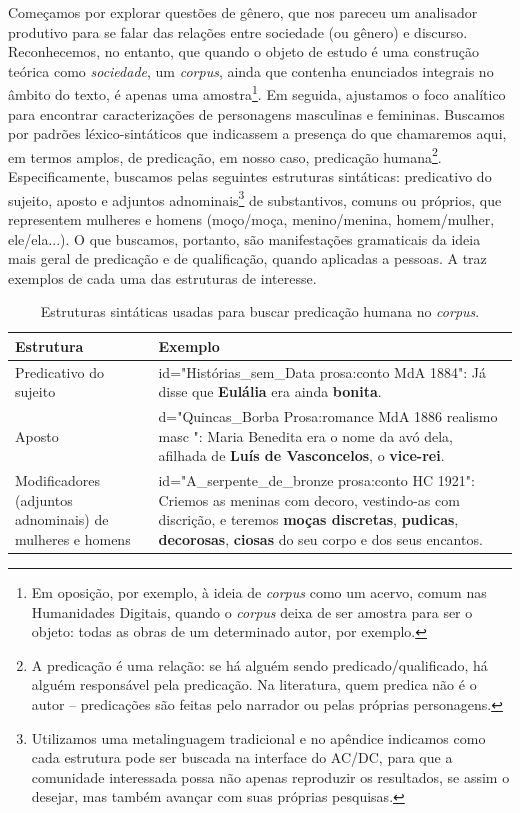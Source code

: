 \documentclass[portuguese]{textolivre}
\begin{document}
Começamos por explorar questões de gênero, que nos pareceu um analisador produtivo para se falar das relações entre sociedade (ou gênero) e discurso. Reconhecemos, no entanto, que quando o objeto de estudo é uma construção teórica como \textit{sociedade}, um \textit{corpus}, ainda que contenha enunciados integrais no âmbito do texto, é apenas uma amostra\footnote{Em oposição, por exemplo, à ideia de \textit{corpus} como um acervo, comum nas Humanidades Digitais, quando o \textit{corpus} deixa de ser amostra para ser o objeto: todas as obras de um determinado autor, por exemplo.}. Em seguida, ajustamos o foco analítico para encontrar caracterizações de personagens masculinas e femininas. Buscamos por padrões léxico-sintáticos que indicassem a presença do que chamaremos aqui, em termos amplos, de predicação, em nosso caso, predicação humana\footnote{A predicação é uma relação: se há alguém sendo predicado/qualificado, há alguém responsável pela predicação. Na literatura, quem predica não é o autor – predicações são feitas pelo narrador ou pelas próprias personagens.}. Especificamente, buscamos pelas seguintes estruturas sintáticas: predicativo do sujeito, aposto e adjuntos adnominais\footnote{Utilizamos uma metalinguagem tradicional e no apêndice indicamos como cada estrutura pode ser buscada na interface do AC/DC, para que a comunidade interessada possa não apenas reproduzir os resultados, se assim o desejar, mas também avançar com suas próprias pesquisas.} de substantivos, comuns ou próprios, que representem mulheres e homens (moço/moça, menino/menina, homem/mulher, ele/ela...). O que buscamos, portanto, são manifestações gramaticais da ideia mais geral de predicação e de qualificação, quando aplicadas a pessoas. A  traz exemplos de cada uma das estruturas de interesse.


\begin{table}[htpb]
\caption{Estruturas sintáticas usadas para buscar predicação humana no \textit{corpus}.}
\label{tbl01}
\begin{tabular} {p{4cm} p{9cm}}
\toprule 
Estrutura & Exemplo \\
\midrule
Predicativo do sujeito & id="Histórias\_sem\_Data prosa:conto MdA 1884": Já disse que \textbf{Eulália} era ainda \textbf{bonita}. \\
\midrule
Aposto & d="Quincas\_Borba Prosa:romance MdA 1886 realismo masc ": Maria Benedita era o nome da avó dela, afilhada de \textbf{Luís de Vasconcelos}, o \textbf{vice-rei}. \\
\midrule
Modificadores (adjuntos adnominais) de mulheres e homens & id="A\_serpente\_de\_bronze prosa:conto HC 1921": Criemos as meninas com decoro, vestindo-as com discrição, e teremos \textbf{moças discretas}, \textbf{pudicas}, \textbf{decorosas}, \textbf{ciosas} do seu corpo e dos seus encantos. \\
\bottomrule
\end{tabular}
\end{table}
\end{document}
